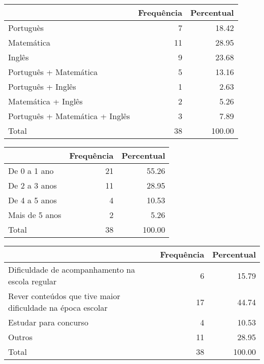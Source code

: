 \documentclass[a4paper, 12pt, openright, oneside, german, french, english, brazil, article]{abntex2}
\begin{document}
	\begin{table}[ht]
		\ibgetab{
		\centering
	}
		{\begin{tabular}{lrr}
			\hline
			& Frequência & Percentual \\ 
			\hline
			Portuguès &   7 & 18.42 \\ 
			Matemática &  11 & 28.95 \\ 
			Inglês &   9 & 23.68 \\ 
			Português + Matemática &   5 & 13.16 \\ 
			Português + Inglês &   1 & 2.63 \\ 
			Matemática + Inglês &   2 & 5.26 \\ 
			Português + Matemática + Inglês &   3 & 7.89 \\ 
			Total &  38 & 100.00 \\ 
			\hline
		\end{tabular}
	}
	{}
	\end{table}
	
	\begin{table}[ht]
		\ibgetab{
		\centering
	}
		{\begin{tabular}{lrr}
			\hline
			& Frequência & Percentual \\ 
			\hline
			De 0 a 1 ano &  21 & 55.26 \\ 
			De 2 a 3 anos &  11 & 28.95 \\ 
			De 4 a 5 anos &   4 & 10.53 \\ 
			Mais de 5 anos &   2 & 5.26 \\ 
			Total &  38 & 100.00 \\ 
			\hline
		\end{tabular}
	}
	{}
	\end{table}

	
	
	\begin{table}[ht]
		\ibgetab{
		\centering
	}
		{\begin{tabular}{p{5cm}rr}
			\hline
			& Frequência & Percentual \\ 
			\hline
			Dificuldade de acompanhamento na escola regular &   6 & 15.79 \\ 
			Rever conteúdos que tive maior dificuldade na época escolar &  17 & 44.74 \\ 
			Estudar para concurso &   4 & 10.53 \\ 
			Outros &  11 & 28.95 \\ 
			Total &  38 & 100.00 \\ 
			\hline
		\end{tabular}
	}
	{}
	\end{table}
	
\end{document}
